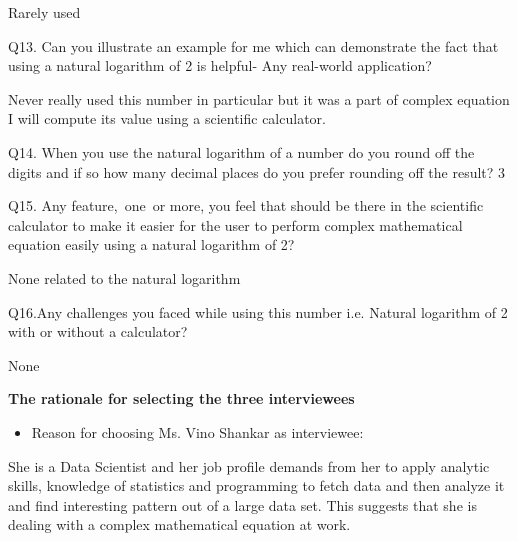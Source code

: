 \documentclass[12pt]{article}
\begin{document}
Rarely used\par


\vspace{\baselineskip}
Q13. Can you illustrate an example for me which can demonstrate the fact that using a natural logarithm of 2 is helpful- Any real-world application?\par

Never really used this number in particular but it was a part of complex equation I will compute its value using a scientific calculator.\par


\vspace{\baselineskip}
Q14. When you use the natural logarithm of a number do you round off the digits and if so how many decimal places do you prefer rounding off the result? 3\par


\vspace{\baselineskip}
Q15. Any feature,\  one\ or more,  you feel that should be there in the scientific calculator to make it easier for the user to perform complex mathematical equation easily using a natural logarithm of 2?\par

None related to the natural logarithm\par


\vspace{\baselineskip}
Q16.Any challenges you faced while using this number i.e. Natural logarithm of 2 with or without a calculator?\par

None\par


\vspace{\baselineskip}
\textbf{The rationale for selecting the three interviewees}\par

\begin{itemize}
	\item Reason for choosing Ms. Vino Shankar as interviewee:
\end{itemize}\par

She is a Data Scientist and her job profile demands from her to apply analytic skills, knowledge of statistics and programming to fetch data and then analyze it and find interesting pattern out of a large data set. This suggests that she is dealing with a complex mathematical equation at work.\par
\end{document}
